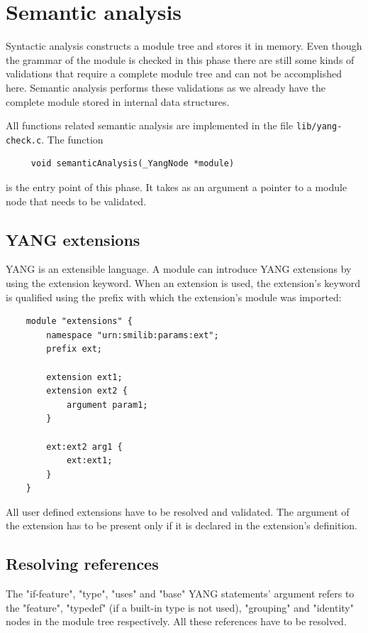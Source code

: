 \documentclass[conference]{IEEEtran}
\begin{document}
\section{Semantic analysis}
Syntactic analysis constructs a module tree and stores it in memory. 
Even though the grammar of the module is checked in this phase there are still some kinds of validations that require a complete module tree
and can not be accomplished here. Semantic analysis performs these validations as we already have the complete module stored in internal data structures.

All functions related semantic analysis are implemented in the file \texttt{lib/yang-check.c}. The function
\small
\begin{verbatim}
     void semanticAnalysis(_YangNode *module)
\end{verbatim}
\normalsize
is the entry point of this phase. It takes as an argument a pointer to a module node that needs to be validated. 

\subsection{YANG extensions}
YANG is an extensible language. A module can introduce YANG extensions by using the extension keyword.
When an extension is used, the extension's keyword is qualified using the prefix with which the extension's module was imported:
\small
\begin{verbatim}
    module "extensions" {
        namespace "urn:smilib:params:ext";
        prefix ext;

        extension ext1;
        extension ext2 {
            argument param1;
        }

        ext:ext2 arg1 {
            ext:ext1;
        }
    }
\end{verbatim}
\normalsize

All user defined extensions have to be resolved and validated. The argument of the extension has to be present only if it is declared in the extension's definition. 

\subsection{Resolving references}
The "if-feature", "type", "uses" and "base" YANG statements' argument refers to the "feature", "typedef" (if a built-in type is not used), "grouping" and "identity"
nodes in the module tree respectively. All these references have to be resolved.   
\end{document}
